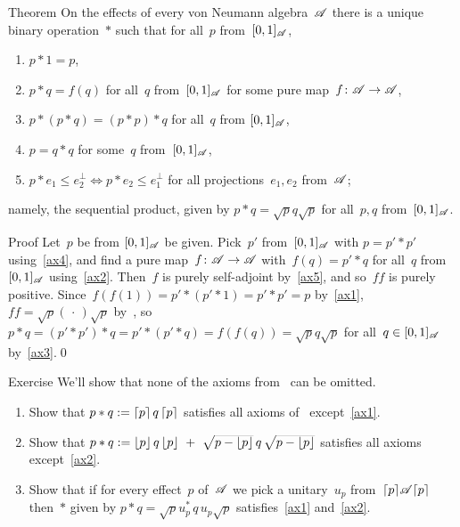 \documentclass[a]{subfiles}
\begin{document}
\begin{parsec}%
\begin{point}{Theorem}%
On the effects of every von Neumann algebra~$\mathscr{A}$
there is a unique binary operation~$\ast$
such that for all~$p$ from~$[0,1]_{\mathscr{A}}$,
\begin{enumerate}
\item \label{ax1}
$p\ast 1 = p$,
\item\label{ax2}
$p\ast q = f(q)$
for all~$q$ from~$[0,1]_{\mathscr{A}}$
for some pure map~$f\colon \mathscr{A}\to\mathscr{A}$,
\item\label{ax3}
$p\ast (p\ast q)=(p\ast p)\ast q$
for all~$q$ from $[0,1]_{\mathscr{A}}$,
\item\label{ax4}
$p=q\ast q$ for some~$q$ from~$[0,1]_{\mathscr{A}}$,
\item\label{ax5}
$p \ast e_1 \leq e_2^\perp
\iff p\ast e_2 \leq e_1^\perp$
for all projections~$e_1,e_2$ from~$\mathscr{A}$;
\end{enumerate}
namely, the sequential product,
given by
$p\ast q = \sqrt{p}q\sqrt{p}$
for all~$p, q$ from~$[0,1]_{\mathscr{A}}$.
\begin{point}{Proof}%
Let~$p$ be from $[0,1]_{\mathscr{A}}$ be given.
Pick~$p'$ from~$[0,1]_{\mathscr{A}}$
with $p = p'\ast p'$
using~\ref{ax4},
and find a pure map~$f\colon \mathscr{A}\to\mathscr{A}$
with~$f(q)=p'\ast q$ for all~$q$ from $[0,1]_{\mathscr{A}}$
using~\ref{ax2}.
Then~$f$ is purely self-adjoint by~\ref{ax5},
and so~$ff$ is purely positive.
Since~$f(f(1))=p'\ast (p'\ast 1)
= p'\ast p'=p$ by~\ref{ax1},
$ff=\sqrt{p}(\,\cdot\,)\sqrt{p}$
by~,
so $p\ast q
= (p'\ast p')\ast q
= p'\ast (p' \ast q) = f(f(q))=\sqrt{p}q\sqrt{p}$
for all~$q\in [0,1]_{\mathscr{A}}$ by~\ref{ax3}.\qed
\end{point}
\end{point}
\begin{point}{Exercise}%
We'll show  that none of the axioms
from~
can be omitted.
\begin{enumerate}
\item
Show that
$p\ast q := \left\lceil p\right\rceil q\left\lceil p\right\rceil$
satisfies all axioms of~
except~\ref{ax1}.
\item
Show that  $p\ast q := \left\lfloor p\right\rfloor q\left\lfloor p\right\rfloor\ +\ \smash{\sqrt{p-\left\lfloor p\right\rfloor}\,q\,
\sqrt{p-\left\lfloor p\right\rfloor}}$
satisfies all axioms except~\ref{ax2}.
\item
Show that if for every effect~$p$ of~$\mathscr{A}$
we pick a unitary~$u_p$ from~$\left\lceil p\right\rceil\!\mathscr{A}\!\left\lceil p\right\rceil$
then~$\ast$ given by
$p\ast q= \sqrt{p}u_p^* \,q\, u_p\sqrt{p}$
satisfies~\ref{ax1} and~\ref{ax2}.


\end{enumerate}
\end{point}
\end{parsec}
\end{document}

